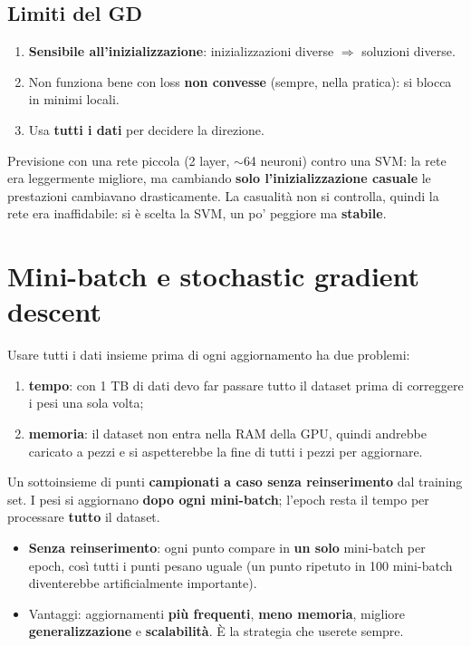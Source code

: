 \subsection{Limiti del GD}
\begin{enumerate}
  \item \textbf{Sensibile all'inizializzazione}: inizializzazioni diverse $\Rightarrow$ soluzioni diverse.
  \item Non funziona bene con loss \textbf{non convesse} (sempre, nella pratica): si blocca in minimi locali.
  \item Usa \textbf{tutti i dati} per decidere la direzione.
\end{enumerate}
\begin{esempio}
Previsione con una rete piccola (2 layer, $\sim$64 neuroni) contro una SVM: la rete era leggermente migliore, ma
cambiando \textbf{solo l'inizializzazione casuale} le prestazioni cambiavano drasticamente. La casualità non si controlla,
quindi la rete era inaffidabile: si è scelta la SVM, un po' peggiore ma \textbf{stabile}.
\end{esempio}

\section{Mini-batch e stochastic gradient descent}
Usare tutti i dati insieme prima di ogni aggiornamento ha due problemi:
\begin{enumerate}
  \item \textbf{tempo}: con 1 TB di dati devo far passare tutto il dataset prima di correggere i pesi una sola volta;
  \item \textbf{memoria}: il dataset non entra nella RAM della GPU, quindi andrebbe caricato a pezzi e si aspetterebbe
        la fine di tutti i pezzi per aggiornare.
\end{enumerate}
\begin{definizione}
Un sottoinsieme di punti \textbf{campionati a caso senza reinserimento} dal training set. I pesi si aggiornano
\textbf{dopo ogni mini-batch}; l'epoch resta il tempo per processare \textbf{tutto} il dataset.
\end{definizione}
\begin{itemize}
  \item \textbf{Senza reinserimento}: ogni punto compare in \textbf{un solo} mini-batch per epoch, così tutti i punti pesano
        uguale (un punto ripetuto in 100 mini-batch diventerebbe artificialmente importante).
  \item Vantaggi: aggiornamenti \textbf{più frequenti}, \textbf{meno memoria}, migliore \textbf{generalizzazione} e
        \textbf{scalabilità}. È la strategia che userete sempre.
\end{itemize}

